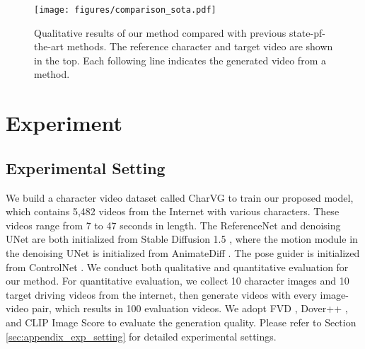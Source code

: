 
\begin{figure*}[!t]
    \centering
    \texttt{[image: figures/comparison\_sota.pdf]}
    \caption{Qualitative results of our method compared with previous state-pf-the-art methods. The reference character and target video are shown in the top. Each following line indicates the generated video from a method.}
    \label{fig:comparison_sota}
\end{figure*}







\section{Experiment}

















\subsection{Experimental Setting}

We build a character video dataset called CharVG to train our proposed model, which contains 5,482 videos from the Internet with various characters.
These videos range from 7 to 47 seconds in length.
The ReferenceNet and denoising UNet are both initialized from Stable Diffusion 1.5 \cite{rombach2022high}, where the motion module in the denoising UNet is initialized from AnimateDiff \cite{guo2024animatediff}.
The pose guider is initialized from ControlNet \cite{zhang2023adding}.
We conduct both qualitative and quantitative evaluation for our method.
For quantitative evaluation, we collect 10 character images and 10 target driving videos from the internet, then generate videos with every image-video pair, which results in 100 evaluation videos.
We adopt FVD \cite{unterthiner2018towards}, Dover++ \cite{wu2023exploring}, and CLIP Image Score \cite{radford2021learning} to evaluate the generation quality.
Please refer to Section \ref{sec:appendix_exp_setting} for detailed experimental settings.


